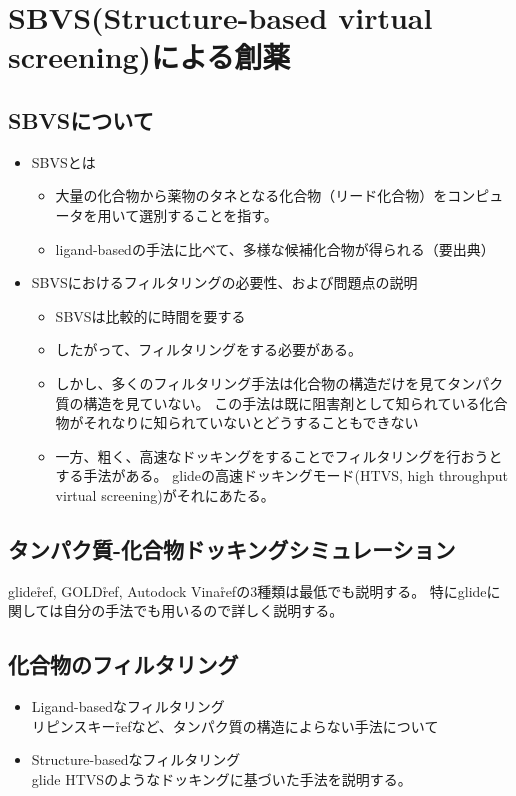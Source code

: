 \chapter{SBVS(Structure-based virtual screening)による創薬}
\section{SBVSについて}
\begin{itemize}
\item SBVSとは
	\begin{itemize}
	\item 大量の化合物から薬物のタネとなる化合物（リード化合物）をコンピュータを用いて選別することを指す。
	\item ligand-basedの手法に比べて、多様な候補化合物が得られる（要出典）
	\end{itemize}
\item SBVSにおけるフィルタリングの必要性、および問題点の説明
	\begin{itemize}
	\item SBVSは比較的に時間を要する
	\item したがって、フィルタリングをする必要がある。
	\item しかし、多くのフィルタリング手法は化合物の構造だけを見てタンパク質の構造を見ていない。
		この手法は既に阻害剤として知られている化合物がそれなりに知られていないとどうすることもできない
	\item 一方、粗く、高速なドッキングをすることでフィルタリングを行おうとする手法がある。
		glideの高速ドッキングモード(HTVS, high throughput virtual screening)がそれにあたる。
	\end{itemize}
\end{itemize}
\section{タンパク質-化合物ドッキングシミュレーション}
glide\r{ref}, GOLD\r{ref}, Autodock Vina\r{ref}の3種類は最低でも説明する。
特にglideに関しては自分の手法でも用いるので詳しく説明する。
\section{化合物のフィルタリング}
\begin{itemize}
\item Ligand-basedなフィルタリング\\
	リピンスキー\r{ref}など、タンパク質の構造によらない手法について
\item Structure-basedなフィルタリング\\
	glide HTVSのようなドッキングに基づいた手法を説明する。
\end{itemize}